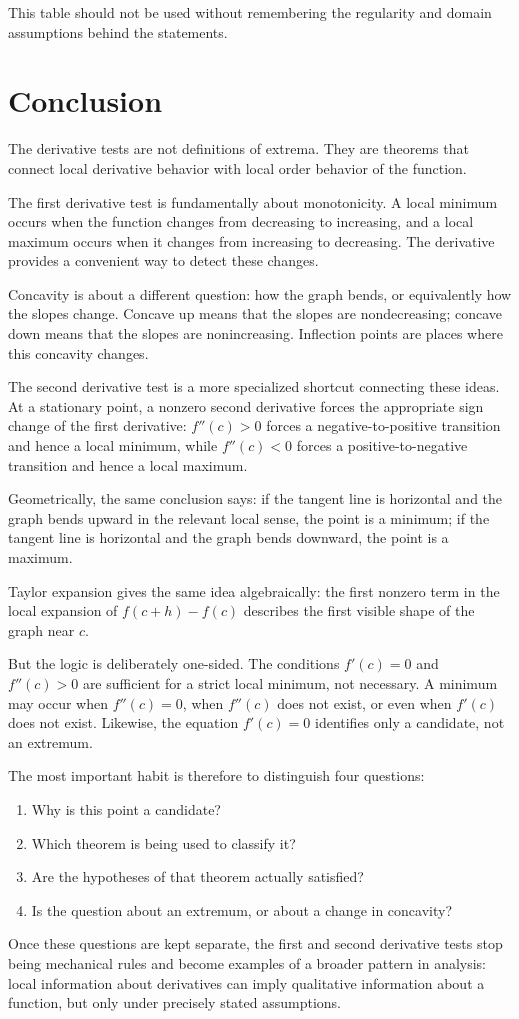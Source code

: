 \documentclass{essay}
\begin{document}
This table should not be used without remembering the regularity and domain assumptions behind the statements.

\section{Conclusion}

The derivative tests are not definitions of extrema. They are theorems that connect local derivative behavior with local order behavior of the function.

The first derivative test is fundamentally about monotonicity. A local minimum occurs when the function changes from decreasing to increasing, and a local maximum occurs when it changes from increasing to decreasing. The derivative provides a convenient way to detect these changes.

Concavity is about a different question: how the graph bends, or equivalently how the slopes change. Concave up means that the slopes are nondecreasing; concave down means that the slopes are nonincreasing. Inflection points are places where this concavity changes.

The second derivative test is a more specialized shortcut connecting these ideas. At a stationary point, a nonzero second derivative forces the appropriate sign change of the first derivative: \(f''(c)>0\) forces a negative-to-positive transition and hence a local minimum, while \(f''(c)<0\) forces a positive-to-negative transition and hence a local maximum.

Geometrically, the same conclusion says: if the tangent line is horizontal and the graph bends upward in the relevant local sense, the point is a minimum; if the tangent line is horizontal and the graph bends downward, the point is a maximum.

Taylor expansion gives the same idea algebraically: the first nonzero term in the local expansion of \(f(c+h)-f(c)\) describes the first visible shape of the graph near \(c\).

But the logic is deliberately one-sided. The conditions \(f'(c)=0\) and \(f''(c)>0\) are sufficient for a strict local minimum, not necessary. A minimum may occur when \(f''(c)=0\), when \(f''(c)\) does not exist, or even when \(f'(c)\) does not exist. Likewise, the equation \(f'(c)=0\) identifies only a candidate, not an extremum.

The most important habit is therefore to distinguish four questions:

\begin{enumerate}
  \item Why is this point a candidate?
  \item Which theorem is being used to classify it?
  \item Are the hypotheses of that theorem actually satisfied?
  \item Is the question about an extremum, or about a change in concavity?
\end{enumerate}

Once these questions are kept separate, the first and second derivative tests stop being mechanical rules and become examples of a broader pattern in analysis: local information about derivatives can imply qualitative information about a function, but only under precisely stated assumptions.
\end{document}
